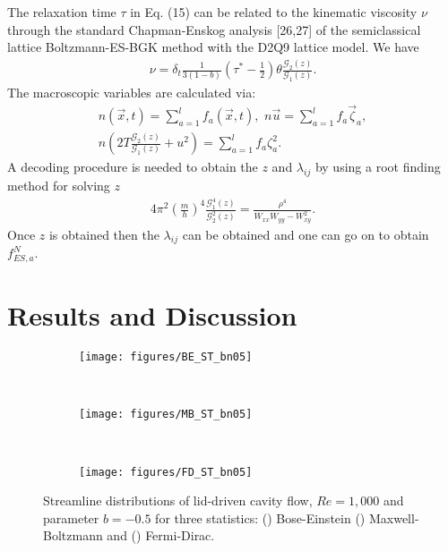 \documentclass[doublecol]{epl2}
\begin{document}
The relaxation time $\tau$ in Eq. (15) can be related to the kinematic viscosity $\nu$ through the standard
Chapman-Enskog analysis [26,27] of the semiclassical lattice Boltzmann-ES-BGK method with the D2Q9 lattice model.  We have
\begin{align}
 \nu =\delta_t \frac{1}{3(1-b)}( \tau^* - \frac{1}{2}) \theta \frac{\mathcal{G}_{2}(z)}{\mathcal{G}_{1}(z)}.
\end{align}
The macroscopic variables are calculated via:
\begin{align}
n(\vec x, t) = \sum_{a=1}^l  f_a(\vec x, t), \,\,
n\vec u = \sum_{a=1}^l  f_a \vec \zeta_a, \nonumber \\
 n (2 T \frac{\mathcal{G}_{2}(z)}{\mathcal{G}_{1}(z)} + u^2) = \sum_{a=1}^l f_a \zeta_a^2.
\end{align}
A decoding procedure is needed to obtain the $z$ and $\lambda_{ij}$ by using a root finding method for solving $z$
\begin{align}
4 \pi^2 \left(\frac{m}{h}\right)^4 \frac{\mathcal{G}^4_{1}(z)}{ \mathcal{G}^2_{2}(z)}= \frac{\rho^4}{W_{xx}W_{yy}-W_{xy}^2}.
\end{align}
Once $z$ is obtained then the $\lambda_{ij}$ can be obtained and one can go on to obtain $f^N_{ES,a}$.

\section{Results and Discussion}

\begin{figure*}[ht]
\centering
        \begin{subfigure}[b]{0.3\textwidth}
                \centering
                \texttt{[image: figures/BE\_ST\_bn05]}
                \caption{ }
                \label{fig:BE_Streamlines_bn05}
        \end{subfigure}%
				~
				\begin{subfigure}[b]{0.3\textwidth}
                \centering
                \texttt{[image: figures/MB\_ST\_bn05]}
                \caption{ }
                \label{fig:MB_Streamlines_bn05}
        \end{subfigure}%
				~
				\begin{subfigure}[b]{0.3\textwidth}
                \centering
                \texttt{[image: figures/FD\_ST\_bn05]}
                \caption{ }
                \label{fig:FD_Streamlines_bn05}
        \end{subfigure}%
	\caption{Streamline distributions of lid-driven cavity flow, $Re=1,000$ and parameter $b=-0.5$ for three statistics:
	() Bose-Einstein () Maxwell-Boltzmann and
 	() Fermi-Dirac.}
	\label{fig:Streamlines_bn05}
\end{figure*}
\end{document}

